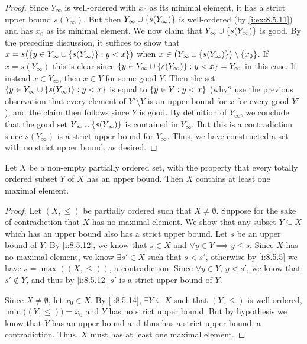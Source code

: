 \begin{proof}
  Since \(Y_{\infty}\) is well-ordered with \(x_0\) as its minimal element, it has a strict upper bound \(s(Y_{\infty})\).
  But then \(Y_{\infty} \cup \left\lbrace s(Y_{\infty})\right\rbrace\) is well-ordered (by \cref{i:ex:8.5.11}) and has \(x_0\) as its minimal element.
  We now claim that \(Y_{\infty} \cup \left\lbrace s(Y_{\infty})\right\rbrace\) is good.
  By the preceding discussion, it suffices to show that \(x = s\big(\set{y \in Y_{\infty} \cup \set{s(Y_{\infty})} : y < x}\big)\) when \(x \in \big(Y_{\infty} \cup \set{s(Y_{\infty})}\big) \setminus \set{x_0}\).
  If \(x = s(Y_{\infty})\) this is clear since \(\left\lbrace y \in Y_{\infty} \cup \left\lbrace s(Y_{\infty})\right\rbrace : y < x\right\rbrace = Y_{\infty}\) in this case.
  If instead \(x \in Y_{\infty}\), then \(x \in Y\) for some good \(Y\).
  Then the set \(\left\lbrace y \in Y_{\infty} \cup \left\lbrace s(Y_{\infty})\right\rbrace: y < x\right\rbrace\) is equal to \(\left\lbrace y \in Y : y < x\right\rbrace\)
  (why? use the previous observation that every element of \(Y' \setminus Y\) is an upper bound for \(x\) for every good \(Y'\)), and the claim then follows since \(Y\) is good.
  By definition of \(Y_{\infty}\), we conclude that the good set \(Y_{\infty} \cup \left\lbrace s(Y_{\infty})\right\rbrace\) is contained in \(Y_{\infty}\).
  But this is a contradiction since \(s(Y_{\infty})\) is a strict upper bound for \(Y_{\infty}\).
  Thus, we have constructed a set with no strict upper bound, as desired.
\end{proof}

\begin{lem}\label{i:8.5.15}
  Let \(X\) be a non-empty partially ordered set, with the property that every totally ordered subset \(Y\) of \(X\) has an upper bound.
  Then \(X\) contains at least one maximal element.
\end{lem}

\begin{proof}
  Let \((X, \leq)\) be partially ordered such that \(X \neq \emptyset\).
  Suppose for the sake of contradiction that \(X\) has no maximal element.
  We show that any subset \(Y \subseteq X\) which has an upper bound also has a strict upper bound.
  Let \(s\) be an upper bound of \(Y\).
  By \cref{i:8.5.12}, we know that \(s \in X\) and \(\forall y \in Y \implies y \leq s\).
  Since \(X\) has no maximal element, we know \(\exists s' \in X\) such that \(s < s'\), otherwise by \cref{i:8.5.5} we have \(s = \max((X, \leq))\), a contradiction.
  Since \(\forall y \in Y\), \(y < s'\), we know that \(s' \notin Y\), and thus by \cref{i:8.5.12} \(s'\) is a strict upper bound of \(Y\).

  Since \(X \neq \emptyset\), let \(x_0 \in X\).
  By \cref{i:8.5.14}, \(\exists Y \subseteq X\) such that \((Y, \leq)\) is well-ordered, \(\min\big((Y, \leq)\big) = x_0\) and \(Y\) has no strict upper bound.
  But by hypothesis we know that \(Y\) has an upper bound and thus has a strict upper bound, a contradiction.
  Thus, \(X\) must has at least one maximal element.
\end{proof}

